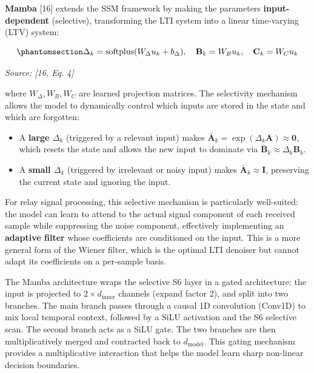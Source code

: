 \textbf{Mamba} {[}16{]} extends the SSM framework by making the parameters \textbf{input-dependent} (selective), transforming the LTI system into a linear time-varying (LTV) system:

\begin{equation}\protect\phantomsection\label{eq:mamba-selective}{\Delta_k = \text{softplus}(W_\Delta u_k + b_\Delta), \quad \mathbf{B}_k = W_B u_k, \quad \mathbf{C}_k = W_C u_k
}\end{equation} \par{\small\textit{Source: [16, Eq. 4]}}

where \(W_\Delta, W_B, W_C\) are learned projection matrices. The selectivity mechanism allows the model to dynamically control which inputs are stored in the state and which are forgotten:

\begin{itemize}
\tightlist
\item
  A \textbf{large \(\Delta_k\)} (triggered by a relevant input) makes \(\bar{\mathbf{A}}_k = \exp(\Delta_k \mathbf{A}) \approx \mathbf{0}\), which resets the state and allows the new input to dominate via \(\bar{\mathbf{B}}_k \approx \Delta_k \mathbf{B}_k\).
\item
  A \textbf{small \(\Delta_k\)} (triggered by irrelevant or noisy input) makes \(\bar{\mathbf{A}}_k \approx \mathbf{I}\), preserving the current state and ignoring the input.
\end{itemize}

For relay signal processing, this selective mechanism is particularly well-suited: the model can learn to attend to the actual signal component of each received sample while suppressing the noise component, effectively implementing an \textbf{adaptive filter} whose coefficients are conditioned on the input. This is a more general form of the Wiener filter, which is the optimal LTI denoiser but cannot adapt its coefficients on a per-sample basis.

The Mamba architecture wraps the selective S6 layer in a gated architecture: the input is projected to \(2 \times d_{\text{inner}}\) channels (expand factor 2), and split into two branches. The main branch passes through a causal 1D convolution (Conv1D) to mix local temporal context, followed by a SiLU activation and the S6 selective scan. The second branch acts as a SiLU gate. The two branches are then multiplicatively merged and contracted back to \(d_{\text{model}}\). This gating mechanism provides a multiplicative interaction that helps the model learn sharp non-linear decision boundaries.

